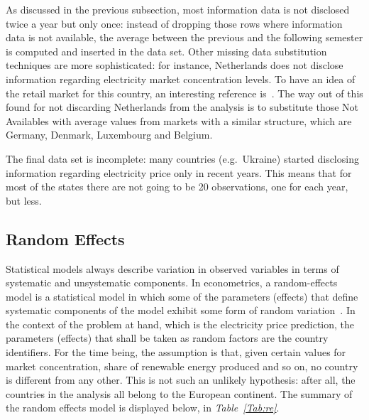 \documentclass[a4paper,12pt]{book}
\begin{document}
As discussed in the previous subsection, most information data is not disclosed twice a year but only once: instead of dropping those rows where information data is not available, the average between the previous and the following semester is computed and inserted in the data set. Other missing data substitution techniques are more sophisticated: for instance, Netherlands does not disclose information regarding electricity market concentration levels. To have an idea of the retail market for this country, an interesting reference is~\cite{mulder2019dutch}.  The way out of this found for not discarding Netherlands from the analysis is to substitute those Not Availables with average values from markets with a similar structure, which are Germany, Denmark, Luxembourg and Belgium.

The final data set is incomplete: many countries (e.g.~Ukraine) started disclosing information regarding electricity price only in recent years. This means that for most of the states there are not going to be 20 observations, one for each year, but less.

\subsection{Random Effects}

Statistical models always describe variation in observed variables in terms of systematic and unsystematic components. In econometrics, a random-effects model is a statistical model in which some of the parameters (effects) that define systematic components of the model exhibit some form of random variation~\cite{salkind2010encyclopedia}. In the context of the problem at hand, which is the electricity price prediction, the parameters (effects) that shall be taken as random factors are the country identifiers. For the time being, the assumption is that, given certain values for market concentration, share of renewable energy produced and so on, no country is different from any other. This is not such an unlikely hypothesis: after all, the countries in the analysis all belong to the European continent. The summary of the random effects model is displayed below, in \textit{Table~\ref{Tab:re}}.
\end{document}
